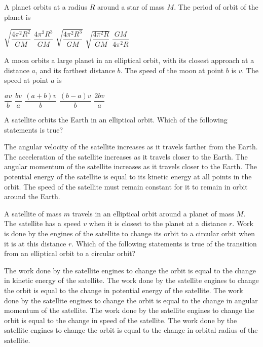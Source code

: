 \documentclass{../../../oss-apphys-exam}
\begin{document}
\begin{questions}
  \question A planet orbits at a radius $R$ around a star of mass $M$. The
  period of orbit of the planet is
  \begin{choices}
    \choice $\sqrt{\dfrac{4\pi^2R^2}{GM}}$
    \choice $\dfrac{4\pi^2R^3}{GM}$
    \choice $\sqrt{\dfrac{4\pi^2R^3}{GM}}$
    \choice $\sqrt{\dfrac{4\pi^2R}{GM}}$
    \choice $\dfrac{GM}{4\pi^2R}$
  \end{choices}
    
  \question A moon orbits a large planet in an elliptical orbit, with its
  closest approach at a distance $a$, and its farthest distance $b$. The speed
  of the moon at point $b$ is $v$. The speed at point $a$ is
  \begin{choices}
    \choice $\dfrac{av}b$
    \choice $\dfrac{bv}a$
    \choice $\dfrac{(a+b)v}b$
    \choice $\dfrac{(b-a)v}b$
    \choice $\dfrac{2bv}a$
  \end{choices}

  \question A satellite orbits the Earth in an elliptical orbit. Which of the
  following statements is true?
  \begin{choices}
    \choice The angular velocity of the satellite increases as it travels
    farther from the Earth.
    \choice The acceleration of the satellite increases as it travels closer
    to the Earth.
    \choice The angular momentum of the satellite increases as it travels
    closer to the Earth.
    \choice The potential energy of the satellite is equal to its kinetic
    energy at all points in the orbit.
    \choice The speed of the satellite must remain constant for it to remain
    in orbit around the Earth.
  \end{choices}
  \newpage
  
  \question A satellite of mass $m$ travels in an elliptical orbit around a
  planet of mass $M$. The satellite has a speed $v$ when it is closest to the
  planet at a distance $r$. Work is done by the engines of the satellite to
  change its orbit to a circular orbit when it is at this distance $r$. Which
  of the following statements is true of the transition from an elliptical
  orbit to a circular orbit?
  \begin{choices}
    \choice The work done by the satellite engines to change the orbit is
    equal to the change in kinetic energy of the satellite.
    \choice The work done by the satellite engines to change the orbit is
    equal to the change in potential energy of the satellite.
    \choice The work done by the satellite engines to change the orbit is
    equal to the change in angular momentum of the satellite.
    \choice The work done by the satellite engines to change the orbit is
    equal to the change in speed of the satellite.
    \choice The work done by the satellite engines to change the orbit is
    equal to the change in orbital radius of the satellite.
  \end{choices}
    

\end{questions}
\end{document}
